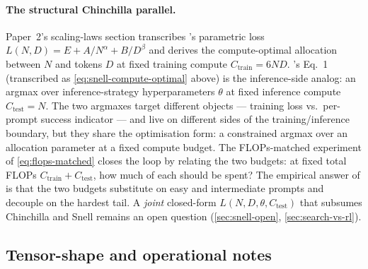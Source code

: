 \paragraph{The structural Chinchilla parallel.} Paper~2's scaling-laws
section transcribes \citet[\S 3, Eq.~2]{hoffmann2022-chinchilla}'s
parametric loss
$L(N, D) = E + A/N^\alpha + B/D^\beta$ and derives the compute-optimal
allocation between  $N$ and tokens $D$ at fixed training
compute $C_\text{train} = 6 N D$. \citet{snell2024}'s Eq.~1 (transcribed
as \cref{eq:snell-compute-optimal} above) is the inference-side
analog: an argmax over inference-strategy hyperparameters $\theta$ at
fixed inference compute $C_\text{test} = N$. The two argmaxes target
different objects --- training loss vs.\ per-prompt success indicator
--- and live on different sides of the training/inference boundary, but
they share the optimisation form: a constrained argmax over an
allocation parameter at a fixed compute budget. The FLOPs-matched
experiment of \cref{eq:flops-matched} closes the loop by relating the
two budgets: at fixed total FLOPs $C_\text{train} + C_\text{test}$,
how much of each should be spent? The empirical answer of
\citet[\S 6]{snell2024} is that the two budgets substitute on easy and
intermediate prompts and decouple on the hardest tail. A
\emph{joint} closed-form $L(N, D, \theta, C_\text{test})$ 
that subsumes Chinchilla and Snell remains an open question
(\cref{sec:snell-open}, \cref{sec:search-vs-rl}).

\subsection{Tensor-shape and operational notes}
\label{sec:snell-tensor-shapes}

